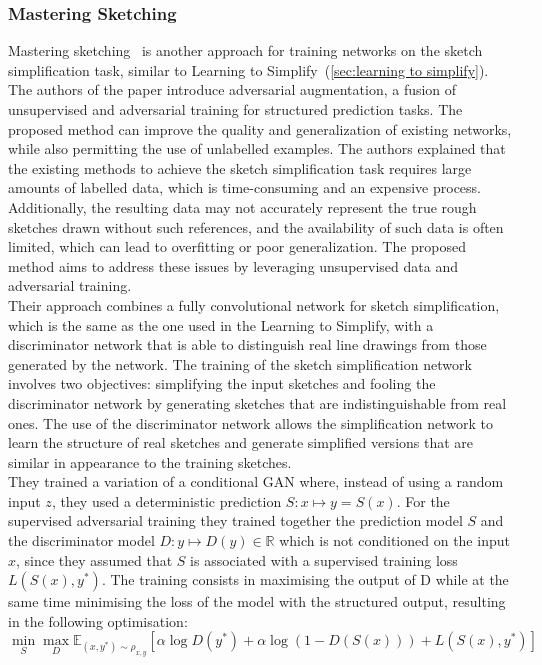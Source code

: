 \subsubsection{Mastering Sketching}
\label{sec:mastering sketching}
Mastering sketching~\cite{masteringSketching} is another approach for training networks on the sketch simplification task, similar to Learning to Simplify~(\ref{sec:learning to simplify}). 
The authors of the paper introduce adversarial augmentation, a fusion of unsupervised and adversarial training for structured prediction tasks. The proposed method can improve the quality and generalization of existing networks, while also permitting the use of unlabelled examples.
The authors explained that the existing methods to achieve the sketch simplification task requires large amounts of labelled data, which is time-consuming and an expensive process. Additionally, the resulting data may not accurately represent the true rough sketches drawn without such references, and the availability of such data is often limited, which can lead to overfitting or poor generalization. The proposed method aims to address these issues by leveraging unsupervised data and adversarial training.\\
Their approach combines a fully convolutional network for sketch simplification, which is the same as the one used in the Learning to Simplify, with a discriminator network that is able to distinguish real line drawings from those generated by the network. The training of the sketch simplification network involves two objectives: simplifying the input sketches and fooling the discriminator network by generating sketches that are indistinguishable from real ones.
The use of the discriminator network allows the simplification network to learn the structure of real sketches and generate simplified versions that are similar in appearance to the training sketches.\\
They trained a variation of a conditional GAN where, instead of using a random input $z$, they used a deterministic prediction $S: x \mapsto y = S(x)$. For the supervised adversarial training they trained together the prediction model $S$ and the discriminator model $D: y \mapsto D(y)\in \mathbb{R}$ which is not conditioned on the input $x$, since they assumed that $S$ is associated with a supervised training loss $L(S(x), y^*)$. The training consists in maximising the output of D while at the same time minimising the loss of the model with the structured output, resulting in the following optimisation:
\begin{equation}
    \label{eq:objective function supervised adv training}
    \min_S \max_D \mathbb{E}_{(x,y^*)\sim \rho_{x,y}}[\alpha\log D(y^*) + \alpha\log(1-D(S(x))) + L(S(x),y^*)]
\end{equation}
